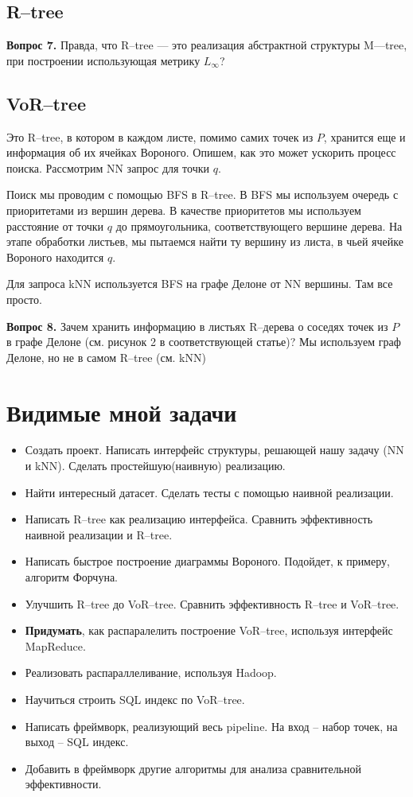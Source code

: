 \documentclass{article}
\begin{document}
        \subsection{R--tree}
            {\bf Вопрос 7.} Правда, что R--tree --- это реализация абстрактной структуры M---tree, при построении использующая метрику $L_\infty$?
            
        \subsection{VoR--tree}
            Это R--tree, в котором в каждом листе, помимо самих точек из $P$, хранится еще и информация об их ячейках Вороного. Опишем, как это может ускорить процесс поиска. Рассмотрим NN запрос для точки $q$.
            
            Поиск мы проводим с помощью BFS в R--tree. В BFS мы используем очередь с приоритетами из вершин дерева. В качестве приоритетов мы используем расстояние от точки $q$ до прямоугольника, соответствующего вершине дерева. На этапе обработки листьев, мы пытаемся найти ту вершину из листа, в чьей ячейке Вороного находится $q$.
            
            Для запроса kNN используется BFS на графе Делоне от NN вершины. Там все просто.            
            
            {\bf Вопрос 8.} Зачем хранить информацию в листьях R--дерева о соседях точек из $P$ в графе Делоне (см. рисунок 2 в соответствующей статье)? Мы используем граф Делоне, но не в самом R--tree (см. kNN)
            
    \section{Видимые мной задачи}
        \begin{itemize}
            \item Создать проект. Написать интерфейс структуры, решающей нашу задачу (NN и kNN). Сделать простейшую(наивную) реализацию.
            \item Найти интересный датасет. Сделать тесты с помощью наивной реализации.
            \item Написать R--tree как реализацию интерфейса. Сравнить эффективность наивной реализации и R--tree.
            \item Написать быстрое построение диаграммы Вороного. Подойдет, к примеру, алгоритм Форчуна.
            \item Улучшить R--tree до VoR--tree. Сравнить эффективность R--tree и VoR--tree.
            \item {\bf Придумать}, как распаралелить построение VoR--tree, используя интерфейс MapReduce.
            \item Реализовать распараллеливание, используя Hadoop.
            \item Научиться строить SQL индекс по VoR--tree.
            \item Написать фреймворк, реализующий весь pipeline. На вход -- набор точек, на выход -- SQL индекс.
            \item Добавить в фреймворк другие алгоритмы для анализа сравнительной эффективности.
        \end{itemize}            
\end{document}
